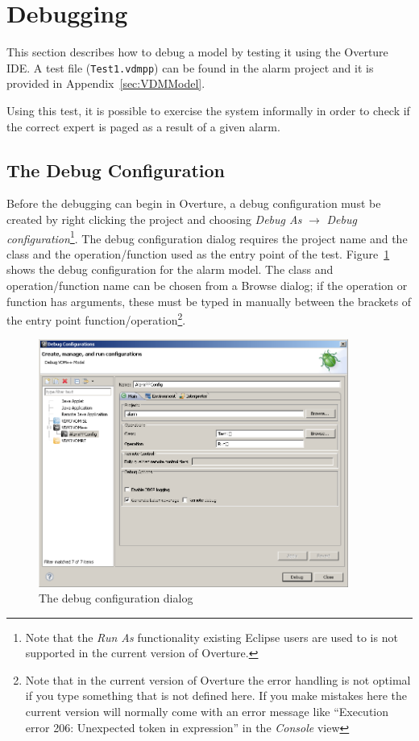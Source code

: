 \section{Debugging}\label{sec:debugging}

This section describes how to debug a model by testing it using the
Overture IDE. A test file (\texttt{Test1.vdmpp}) can be
found in the alarm project and it is provided in
Appendix~\ref{sec:VDMModel}.

\lstset{language=VDM++}
%

Using this test, it is possible to exercise the system informally in
order to check if the correct expert is paged as a result of a given
alarm.


\subsection{The Debug Configuration}

Before the debugging can begin in Overture, a debug configuration must
be created by right clicking the project and choosing \emph{Debug As}
$ \rightarrow $ \emph{Debug configuration}\footnote{Note that the
  \emph{Run As} functionality existing Eclipse users are used to is
  not supported in the current version of Overture.}. The debug configuration
dialog requires the project name and the class and the operation/function
used as the entry point of the test.  Figure~\ref{fig:debugConfiguration}
shows the debug configuration for the alarm model. The class and
operation/function name can be chosen from a Browse dialog; if the
operation or function has arguments, these must be typed in manually
between the brackets of the entry point
function/operation\footnote{Note that in the current version of
  Overture the error handling is not optimal if you type something
  that is not defined here. If you make mistakes here the current
  version will normally come with an error message like ``Execution
  error 206: Unexpected token in expression'' in the \emph{Console} view}.

\begin{figure}[htp]
\begin{center}
  \includegraphics[width=4in]{figures/DebugConfiguration}
  \caption{The debug configuration dialog}
  \label{fig:debugConfiguration}
\end{center}
\end{figure}

